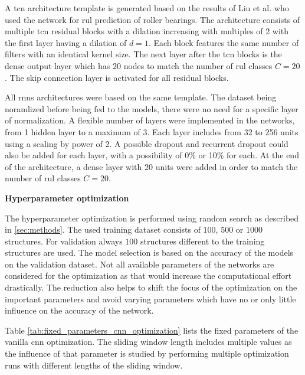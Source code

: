 \documentclass[conference]{IEEEtran}
\begin{document}
A \gls{tcn} architecture template is generated based on the results of Liu et al. \cite{Liu2019} who used the network for \gls{rul} prediction of roller bearings. The architecture consists of multiple \gls{tcn} residual blocks with a dilation increasing with multiples of 2 with the first layer having a dilation of $ d = 1 $. Each block features the same number of filters with an identical kernel size. The next layer after the \gls{tcn} blocks is the dense output layer which has $ 20 $ nodes to match the number of \gls{rul} classes $ C = 20 $. The skip connection layer is activated for all residual blocks.

All \glspl{rnn} architectures were based on the same template. The dataset being noramlized before being fed to the models, there were no need for a specific layer of normalization. A flexible number of layers were implemented in the networks, from 1 hidden layer to a maximum of 3. Each layer includes from 32 to 256 units using a scaling by power of 2. A possible dropout and recurrent dropout could also be added for each layer, with a possibility of 0\% or 10\% for each. At the end of the architecture, a dense layer with 20 units were added in order to match the number of \gls{rul} classes $ C = 20 $.  


\noindent
\textbf{Hyperparameter optimization}

The hyperparameter optimization is performed using random search as described in \ref{sec:methods}. The used training dataset consists of $ 100 $, $ 500 $ or $ 1000 $ structures. For validation always $ 100 $ structures different to the training structures are used. The model selection is based on the accuracy of the models on the validation dataset. Not all available parameters of the networks are considered for the optimization as that would increase the computational effort drastically. The reduction also helps to shift the focus of the optimization on the important parameters and avoid varying parameters which have no or only little influence on the accuracy of the network.

Table \ref{tab:fixed_parameters_cnn_optimization} lists the fixed parameters of the vanilla \gls{cnn} optimization. The sliding window length includes multiple values as the influence of that parameter is studied by performing multiple optimization runs with different lengths of the sliding window.
\end{document}
